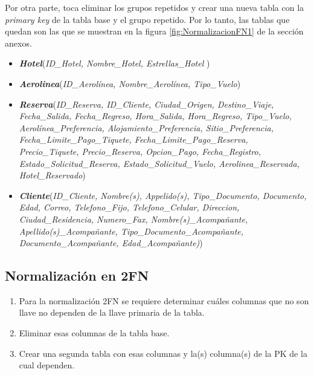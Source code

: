 \documentclass{article}
\begin{document}
Por otra parte, toca eliminar los grupos repetidos y crear una nueva tabla con la \textit{primary key} de la tabla base y el grupo repetido. Por lo tanto, las tablas que quedan son las que se muestran en la figura \ref{fig:NormalizacionFN1} de la sección anexos.
\begin{itemize}
    \item \textit{\textbf{Hotel}}(\textit{ID\_Hotel, Nombre\_Hotel, Estrellas\_Hotel })
    \item \textbf{\textit{Aerolinea}}(\textit{ID\_Aerolínea, Nombre\_Aerolínea, Tipo\_Vuelo})
    \item \textbf{\textit{Reserva}}(\textit{ID\_Reserva, ID\_Cliente, Ciudad\_Origen, Destino\_Viaje, Fecha\_Salida, Fecha\_Regreso, Hora\_Salida, Hora\_Regreso, Tipo\_Vuelo, Aerolínea\_Preferencia, Alojamiento\_Preferencia, Sitio\_Preferencia, Fecha\_Limite\_Pago\_Tiquete, Fecha\_Limite\_Pago\_Reserva, Precio\_Tiquete, Precio\_Reserva, Opcion\_Pago, Fecha\_Registro, Estado\_Solicitud\_Reserva, Estado\_Solicitud\_Vuelo, Aerolinea\_Reservada, Hotel\_Reservado})
    \item \textbf{\textit{Cliente}}(\textit{ID\_Cliente, Nombre(s), Appelido(s), Tipo\_Documento, Documento, Edad, Correo, Telefono\_Fijo, Telefono\_Celular, Direccion, Ciudad\_Residencia, Numero\_Fax, Nombre(s)\_Acompañante, Apellido(s)\_Acompañante, Tipo\_Documento\_Acompañante, Documento\_Acompañante, Edad\_Acompañante)})
\end{itemize}





\subsection{Normalización en 2FN}

\begin{enumerate}
    \item Para la normalización 2FN se requiere determinar cuáles columnas que no son llave no dependen de la llave primaria de la tabla. 
    \item Eliminar esas columnas de la tabla base.
    \item Crear una segunda tabla con esas columnas y la(s) columna(s) de la PK de la cual dependen.
\end{enumerate}
\end{document}
